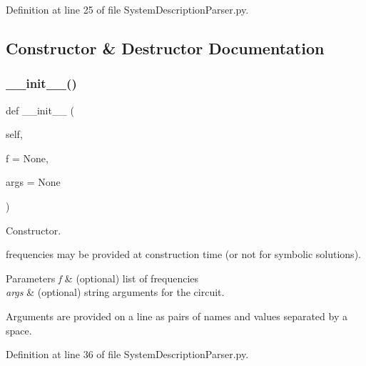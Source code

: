 Definition at line 25 of file System\+Description\+Parser.\+py.



\subsection{Constructor \& Destructor Documentation}
\mbox{\label{classSignalIntegrity_1_1Parsers_1_1SystemDescriptionParser_1_1SystemDescriptionParser_af9856388f7022892c3159ad55872a27e}} 
\subsubsection{\texorpdfstring{\+\_\+\+\_\+init\+\_\+\+\_\+()}{\_\_init\_\_()}}
{\footnotesize\ttfamily def \+\_\+\+\_\+init\+\_\+\+\_\+ (\begin{DoxyParamCaption}\item[{}]{self,  }\item[{}]{f = {\ttfamily None},  }\item[{}]{args = {\ttfamily None} }\end{DoxyParamCaption})}



Constructor. 

frequencies may be provided at construction time (or not for symbolic solutions).


\begin{DoxyParams}{Parameters}
{\em f} & (optional) list of frequencies \\
\hline
{\em args} & (optional) string arguments for the circuit.\\
\hline
\end{DoxyParams}
Arguments are provided on a line as pairs of names and values separated by a space. 

Definition at line 36 of file System\+Description\+Parser.\+py.



